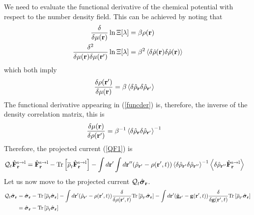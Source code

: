 \documentclass[b5paper,openright,11pt]{book}
\newcommand{\llangle}{\left\langle}
\newcommand{\rrangle}{\right\rangle}
\begin{document}
\begin{appendices}
We need to evaluate the functional derivative of the chemical potential with respect to the number density field. This can be achieved by noting that 
\begin{align}
  \frac{\delta}{\delta \mu({\bf r})}\ln \Xi[\lambda]&=\beta\rho({\bf r})
\nonumber\\
  \frac{\delta^2}{\delta \mu({\bf r})\delta \mu({\bf r}')}\ln \Xi[\lambda]&=
\beta^2\llangle \delta\hat{\rho}({\bf r})\delta\hat{\rho}({\bf r})\rrangle
\label{chi1}
\end{align}
which both imply
\begin{align}
  \frac{\delta \rho({\bf r}')  }{\delta \mu({\bf r})}&=\beta
\llangle \delta\hat{\rho}_{{\bf r}}\delta\hat{\rho}_{{\bf r}'}\rrangle
\label{chi2}
\end{align}
The functional derivative appearing in (\ref{funcder}) is, therefore, the inverse of the
density correlation matrix, this is
\begin{align}
  \frac{\delta \mu({\bf r})}{\delta \rho({\bf r}')  }&=\beta^{-1}
\llangle \delta\hat{\rho}_{{\bf r}}\delta\hat{\rho}_{{\bf r}'}\rrangle^{-1}
\label{chi3}
\end{align}
Therefore, the projected current (\ref{QF1}) is
\begin{align}
  {\cal Q}_t\hat{\bf F}^{\rm s\to l}_{{\bf r}}&=
\hat{\bf F}^{\rm s\to l}_{{\bf r}}- {\rm Tr}\left[\overline{\rho}_{t} \hat{\bf F}^{\rm s\to l}_{{\bf r}}\right]
-\int d{\bf r}'\int d{\bf r}''(\hat{\rho}_{{\bf r}'}-{\rho}({\bf r}',t))
\llangle \delta\hat{\rho}_{{\bf r}'}\delta\hat{\rho}_{{\bf r}''}\rrangle^{-1}
\llangle \delta \hat{\rho}_{{\bf r}''}\hat{\bf F}^{\rm s\to l}_{{\bf r}}\rrangle\label{QF1b}
\end{align}
Let us now move to the projected current ${\cal Q}_t\hat{\boldsymbol{\sigma}}_{\bf r}$. 
\begin{align}
  {\cal Q}_t\hat{\boldsymbol{\sigma}}_{{\bf r}}&=
\hat{\boldsymbol{\sigma}}_{{\bf r}}- {\rm Tr}\left[\overline{\rho}_{t} \hat{\boldsymbol{\sigma}}_{{\bf r}}\right]
-\int d{\bf r}'(\hat{\rho}_{{\bf r}'}-\rho({\bf r}',t))
\frac{\delta}{\delta \rho({\bf r}',t)}{\rm Tr}\left[\overline{\rho}_{t'}\hat{\boldsymbol{\sigma}}_{{\bf r}}\right]
-\int d{\bf r}'(\hat{\bf g}_{{\bf r}'}-{\bf g}({\bf r}',t))
\frac{\delta}{\delta {\bf g}({\bf r}',t)}{\rm Tr}\left[\overline{\rho}_{t'}  \hat{\boldsymbol{\sigma}}_{{\bf r}}\right]
\nonumber\\
&=\hat{\boldsymbol{\sigma}}_{{\bf r}}- {\rm Tr}\left[\overline{\rho}_{t} \hat{\boldsymbol{\sigma}}_{{\bf r}}\right]
\nonumber\\

\end{align}
\end{appendices}
\end{document}
